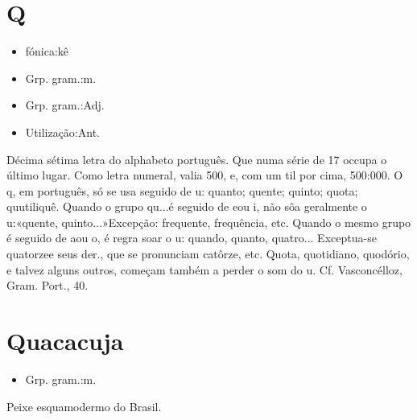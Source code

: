 \section{Q}
\begin{itemize}
\item {fónica:kê}
\end{itemize}
\begin{itemize}
\item {Grp. gram.:m.}
\end{itemize}
\begin{itemize}
\item {Grp. gram.:Adj.}
\end{itemize}
\begin{itemize}
\item {Utilização:Ant.}
\end{itemize}
Décima sétima letra do alphabeto português.
Que numa série de 17 occupa o último lugar.
Como letra numeral, valia 500, e, com um til por cima, 500:000.
O \textunderscore q\textunderscore , em português, só se usa seguido de \textunderscore u\textunderscore : \textunderscore quanto\textunderscore ; \textunderscore quente\textunderscore ; \textunderscore quinto\textunderscore ; \textunderscore quota\textunderscore ; \textunderscore quutiliquê\textunderscore .
Quando o grupo \textunderscore qu...\textunderscore  é seguido de \textunderscore e\textunderscore  ou \textunderscore i\textunderscore , não sôa geralmente o \textunderscore u\textunderscore :«\textunderscore quente\textunderscore , \textunderscore quinto...\textunderscore »Excepção: \textunderscore frequente\textunderscore , \textunderscore frequência\textunderscore , etc.
Quando o mesmo grupo é seguido de \textunderscore a\textunderscore  ou \textunderscore o\textunderscore , é regra soar o \textunderscore u\textunderscore : \textunderscore quando\textunderscore , \textunderscore quanto\textunderscore , \textunderscore quatro...\textunderscore 
Exceptua-se \textunderscore quatorze\textunderscore  e seus der., que se pronunciam \textunderscore catôrze\textunderscore , etc.
\textunderscore Quota\textunderscore , \textunderscore quotidiano\textunderscore , \textunderscore quodório\textunderscore , e talvez alguns outros, começam também a perder o som do \textunderscore u\textunderscore . Cf. Vasconcélloz, \textunderscore Gram. Port.\textunderscore , 40.
\section{Quacacuja}
\begin{itemize}
\item {Grp. gram.:m.}
\end{itemize}
Peixe esquamodermo do Brasil.
